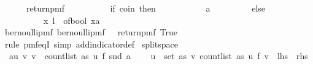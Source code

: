 \begin{isabellebody}
\ \ \ \ \ \ return{\isacharunderscore}{\kern0pt}pmf\ {\isacharparenleft}{\kern0pt}\ \isanewline
\ \ \ \ \ \ \ \ if\ coin\ then\ \isanewline
\ \ \ \ \ \ \ \ \ \ {\isacharparenleft}{\kern0pt}a{\isacharcomma}{\kern0pt}{}{\isacharparenright}{\kern0pt}\ \isanewline
\ \ \ \ \ \ \ \ else\ {\isacharparenleft}{\kern0pt}\isanewline
\ \ \ \ \ \ \ \ \ \ {\isacharparenleft}{\kern0pt}x{\isacharcomma}{\kern0pt}\ l\ {\isacharplus}{\kern0pt}\ of{\isacharunderscore}{\kern0pt}bool\ {\isacharparenleft}{\kern0pt}x{\isacharequal}{\kern0pt}a{\isacharparenright}{\kern0pt}{\isacharparenright}{\kern0pt}\isanewline
\ \ \ \ \ \ \ \ {\isacharparenright}{\kern0pt}\isanewline
\ \ \ \ \ \ {\isacharparenright}{\kern0pt}\isanewline
\ \ \ \ {\isacharbraceright}{\kern0pt}{\isachardoublequoteclose}\isanewline
\isanewline
{}\isamarkupfalse%
\ bernoulli{\isacharunderscore}{\kern0pt}pmf{\isacharunderscore}{\kern0pt}{}{\isacharcolon}{\kern0pt}\ {\isachardoublequoteopen}bernoulli{\isacharunderscore}{\kern0pt}pmf\ {}\ {\isacharequal}{\kern0pt}\ return{\isacharunderscore}{\kern0pt}pmf\ True{\isachardoublequoteclose}\isanewline
%
\isadelimproof
\ \ \ \ %
\endisadelimproof
%
\isatagproof
{}\isamarkupfalse%
\ {\isacharparenleft}{\kern0pt}rule\ pmf{\isacharunderscore}{\kern0pt}eqI{\isacharcomma}{\kern0pt}\ simp\ add{\isacharcolon}{\kern0pt}indicator{\isacharunderscore}{\kern0pt}def{\isacharparenright}{\kern0pt}%
\endisatagproof
{\isafoldproof}%
%
\isadelimproof
\isanewline
%
\endisadelimproof
\isanewline
{}\isamarkupfalse%
\ split{\isacharunderscore}{\kern0pt}space{\isacharcolon}{\kern0pt}\isanewline
\ \ {\isachardoublequoteopen}{\isacharparenleft}{\kern0pt}{\isasymSum}a{\isasymin}{\isacharbraceleft}{\kern0pt}{\isacharparenleft}{\kern0pt}u{\isacharcomma}{\kern0pt}\ v{\isacharparenright}{\kern0pt}{\isachardot}{\kern0pt}\ v\ {\isacharless}{\kern0pt}\ count{\isacharunderscore}{\kern0pt}list\ as\ u{\isacharbraceright}{\kern0pt}{\isachardot}{\kern0pt}\ {\isacharparenleft}{\kern0pt}f\ {\isacharparenleft}{\kern0pt}snd\ a{\isacharparenright}{\kern0pt}{\isacharparenright}{\kern0pt}{\isacharparenright}{\kern0pt}\ {\isacharequal}{\kern0pt}\ \isanewline
\ \ {\isacharparenleft}{\kern0pt}{\isasymSum}u\ {\isasymin}\ set\ as{\isachardot}{\kern0pt}\ {\isacharparenleft}{\kern0pt}{\isasymSum}v\ {\isasymin}{\isacharbraceleft}{\kern0pt}{}{\isachardot}{\kern0pt}{\isachardot}{\kern0pt}{\isacharless}{\kern0pt}count{\isacharunderscore}{\kern0pt}list\ as\ u{\isacharbraceright}{\kern0pt}{\isachardot}{\kern0pt}\ {\isacharparenleft}{\kern0pt}f\ v{\isacharparenright}{\kern0pt}{\isacharparenright}{\kern0pt}{\isacharparenright}{\kern0pt}{\isachardoublequoteclose}\ {\isacharparenleft}{\kern0pt}\ {\isachardoublequoteopen}{\isacharquery}{\kern0pt}lhs\ {\isacharequal}{\kern0pt}\ {\isacharquery}{\kern0pt}rhs{\isachardoublequoteclose}{\isacharparenright}{\kern0pt}\isanewline

\end{isabellebody}
